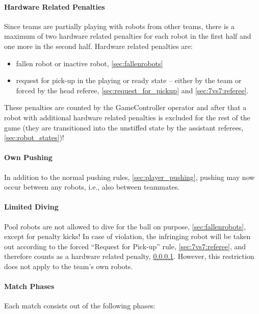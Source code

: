         \paragraph{Hardware Related Penalties}
            \label{sec:7vs7:hardware_related_penalties}
            Since teams are partially playing with robots from other teams, there is a maximum of two hardware related penalties for each robot in the first half and one more in the second half.
            Hardware related penalties are:
            \begin{itemize}
                \item fallen robot or inactive robot, \cf \cref{sec:fallenrobots}
                \item request for pick-up in the playing or ready state -- either by the team or forced by the head referee, \cf \cref{sec:request_for_pickup} and \cref{sec:7vs7:referee}.
            \end{itemize}
            These penalties are counted by the GameController operator and after that a robot with additional hardware related penalties is excluded for the rest of the game (they are transitioned into the unstiffed state by the assistant referees, \cf \cref{sec:robot_states})!

        \paragraph{Own Pushing}
            In addition to the normal pushing rules, \cf \cref{sec:player_pushing}, pushing may now occur between any robots, i.e., also between teammates.

        \paragraph{Limited Diving}
            Pool robots are not allowed to dive for the ball on purpose, \cf \cref{sec:fallenrobots}, except for penalty kicks! In case of violation, the infringing robot will be taken out according to the forced ``Request for Pick-up'' rule, \cf \cref{sec:7vs7:referee}, and therefore counts as a hardware related penalty, \cf \cref{sec:7vs7:hardware_related_penalties}. However, this restriction does not apply to the team's own robots.

        \paragraph{Match Phases}
            Each match consists out of the following phases:
